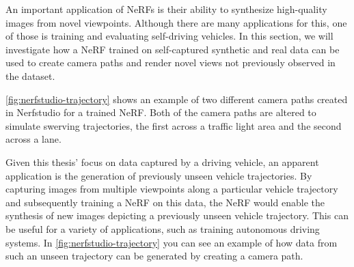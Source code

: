 An important application of NeRFs is their ability to synthesize high-quality images from novel viewpoints. Although there are many applications for this, one of those is training and evaluating self-driving vehicles. In this section, we will investigate how a NeRF trained on self-captured synthetic and real data can be used to create camera paths and render novel views not previously observed in the dataset.




\autoref{fig:nerfstudio-trajectory} shows an example of two different camera paths created in Nerfstudio for a trained NeRF. Both of the camera paths are altered to simulate swerving trajectories, the first across a traffic light area and the second across a lane.

Given this thesis' focus on data captured by a driving vehicle, an apparent application is the generation of previously unseen vehicle trajectories. By capturing images from multiple viewpoints along a particular vehicle trajectory and subsequently training a NeRF on this data, the NeRF would enable the synthesis of new images depicting a previously unseen vehicle trajectory. This can be useful for a variety of applications, such as training autonomous driving systems. In \autoref{fig:nerfstudio-trajectory} you can see an example of how data from such an unseen trajectory can be generated by creating a camera path.





